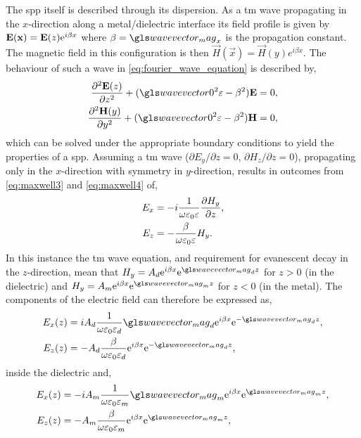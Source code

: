 \documentclass{article}
\begin{document}
The \gls{spp} itself is described through its dispersion. As a \gls{tm} wave propagating in the $x$-direction along a metal/dielectric interface its field profile is given by $\mathbf{E}(\mathbf{x}) = \mathbf{E}(z)\mathrm{e}^{i\beta x}$ where $\beta=\wvm_x$ is the propagation constant. The magnetic field in this configuration is then $\vec{H}(\vec{x}) = \vec{H}(y)e^{i\beta x}$. The behaviour of such a wave in \eqref{eq:fourier_wave_equation} is described by,
\begin{subequations}
\begin{align}
	\frac{\partial^2\vec{E}(z)}{\partial z^2} + (\wvz^2\eps - \beta^2)\vec{E} &= 0,\\
	\frac{\partial^2\vec{H}(y)}{\partial y^2} + (\wvz^2\eps - \beta^2)\vec{H} &= 0,
\end{align}
\end{subequations}
which can be solved under the appropriate boundary conditions to yield the properties of a \gls{spp}. Assuming a \gls{tm} wave ($\partial E_y/\partial z = 0$, $\partial H_z/\partial z = 0$), propagating only in the $x$-direction with symmetry in $y$-direction, results in outcomes from \eqref{eq:maxwell3} and \eqref{eq:maxwell4} of,
\begin{subequations}
\begin{align}
	E_x &= -i\frac{1}{\omega\varepsilon_0\varepsilon}\frac{\partial H_y}{\partial z},\\
	E_z &= -\frac{\beta}{\omega\varepsilon_0\varepsilon}H_y.
\end{align}
\end{subequations}
In this instance the \gls{tm} wave equation, and requirement for evanescent decay in the $z$-direction, mean that $H_y = A_d\e^{i\beta x}\e^{\wvm_dz}$ for $z>0$ (in the dielectric) and $H_y = A_m\e^{i\beta x}\e^{\wvm_mz}$ for $z<0$ (in the metal). The components of the electric field can therefore be expressed as,
\begin{subequations}
\begin{align}
	E_x(z) &= iA_d\frac{1}{\omega\epsfs\epsdi}\wvm_d\e^{i\beta x}\e^{-\wvm_dz},\\
	E_z(z) &= -A_d\frac{\beta}{\omega\epsfs\epsdi}\e^{i\beta x}\e^{-\wvm_dz},
\end{align}
\end{subequations}
inside the dielectric and,
\begin{subequations}
\begin{align}
	E_x(z) &= -iA_m\frac{1}{\omega\epsfs\epsmet}\wvm_m\e^{i\beta x}\e^{\wvm_mz},\\
	E_z(z) &= -A_m\frac{\beta}{\omega\epsfs\epsmet}\e^{i\beta x}\e^{\wvm_mz},
\end{align}
\end{subequations}
\end{document}
